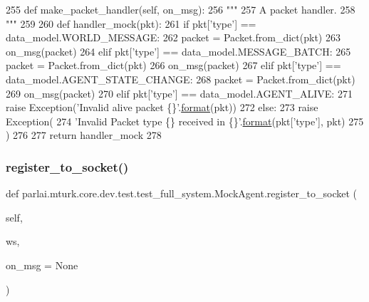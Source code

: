 \begin{DoxyCode}
255     \textcolor{keyword}{def }make\_packet\_handler(self, on\_msg):
256         \textcolor{stringliteral}{"""}
257 \textcolor{stringliteral}{        A packet handler.}
258 \textcolor{stringliteral}{        """}
259 
260         \textcolor{keyword}{def }handler\_mock(pkt):
261             \textcolor{keywordflow}{if} pkt[\textcolor{stringliteral}{'type'}] == data\_model.WORLD\_MESSAGE:
262                 packet = Packet.from\_dict(pkt)
263                 on\_msg(packet)
264             \textcolor{keywordflow}{elif} pkt[\textcolor{stringliteral}{'type'}] == data\_model.MESSAGE\_BATCH:
265                 packet = Packet.from\_dict(pkt)
266                 on\_msg(packet)
267             \textcolor{keywordflow}{elif} pkt[\textcolor{stringliteral}{'type'}] == data\_model.AGENT\_STATE\_CHANGE:
268                 packet = Packet.from\_dict(pkt)
269                 on\_msg(packet)
270             \textcolor{keywordflow}{elif} pkt[\textcolor{stringliteral}{'type'}] == data\_model.AGENT\_ALIVE:
271                 \textcolor{keywordflow}{raise} Exception(\textcolor{stringliteral}{'Invalid alive packet \{\}'}.\hyperlink{namespaceparlai_1_1chat__service_1_1services_1_1messenger_1_1shared__utils_a32e2e2022b824fbaf80c747160b52a76}{format}(pkt))
272             \textcolor{keywordflow}{else}:
273                 \textcolor{keywordflow}{raise} Exception(
274                     \textcolor{stringliteral}{'Invalid Packet type \{\} received in \{\}'}.\hyperlink{namespaceparlai_1_1chat__service_1_1services_1_1messenger_1_1shared__utils_a32e2e2022b824fbaf80c747160b52a76}{format}(pkt[\textcolor{stringliteral}{'type'}], pkt)
275                 )
276 
277         \textcolor{keywordflow}{return} handler\_mock
278 
\end{DoxyCode}
\mbox{\label{classparlai_1_1mturk_1_1core_1_1dev_1_1test_1_1test__full__system_1_1MockAgent_a97d5a5cb8bf72c4a294e51e0cf275911}} 
\subsubsection{\texorpdfstring{register\+\_\+to\+\_\+socket()}{register\_to\_socket()}}
{\footnotesize\ttfamily def parlai.\+mturk.\+core.\+dev.\+test.\+test\+\_\+full\+\_\+system.\+Mock\+Agent.\+register\+\_\+to\+\_\+socket (\begin{DoxyParamCaption}\item[{}]{self,  }\item[{}]{ws,  }\item[{}]{on\+\_\+msg = {\ttfamily None} }\end{DoxyParamCaption})}



